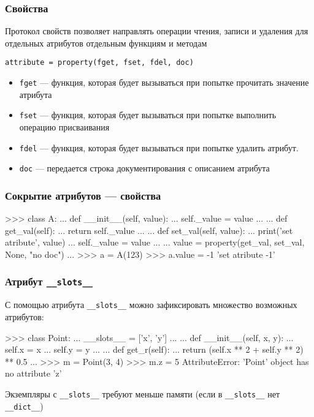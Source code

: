 \documentclass[fleqn, xcolor=x11names, 11pt]{beamer}
\begin{document}
\begin{frame}[fragile]\frametitle{Свойства}
Протокол свойств позволяет направлять операции чтения, записи и удаления для отдельных атрибутов отдельным функциям и методам

\hfill

\texttt{attribute = property(fget, fset, fdel, doc)}

\hfill
\begin{itemize}

\item \texttt{fget} --- функция, которая будет вызываться при попытке прочитать значение атрибута

\item \texttt{fset} --- функция, которая будет вызываться при попытке выполнить операцию присваивания

\item \texttt{fdel} --- функция, которая будет вызываться при попытке удалить атрибут. 

\item \texttt{doc} --- передается строка документирования с описанием атрибута

\end{itemize}

\end{frame}


\begin{frame}[fragile]\frametitle{Сокрытие атрибутов --- свойства}
\begin{pcode}
>>> class A:
...    def __init__(self, value):
...        self._value = value
...    
...    def get_val(self):
...        return self._value
...    
...    def set_val(self, value):
...        print('set atribute', value)
...        self._value = value
...        
...    value = property(get_val, set_val, None, "no doc")
...
>>> a = A(123)
>>> a.value = -1
'set atribute -1'
\end{pcode}
\end{frame}

\begin{frame}[fragile]\frametitle{Атрибут \texttt{\_\_slots\_\_}}
С помощью атрибута \texttt{__slots__} можно зафиксировать множество возможных атрибутов:

\begin{pcode}
>>> class Point:
...    __slots__ = ['x', 'y']
...    
...    def __init__(self, x, y):
...        self.x = x
...        self.y = y
...        
...    def get_r(self):
...        return (self.x ** 2 + self.y ** 2) ** 0.5
...
>>> m = Point(3, 4)
>>> m.z = 5
AttributeError: 'Point' object has no attribute 'z'
\end{pcode}

Экземпляры с \texttt{__slots__} требуют меньше памяти (если в \texttt{__slots__} нет \texttt{__dict__})
\end{frame}
\end{document}
